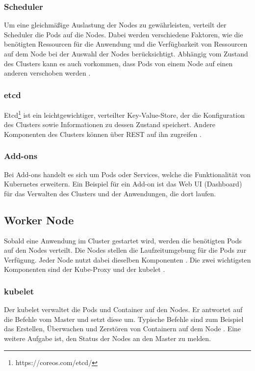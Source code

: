 \subsubsection{Scheduler}
\label{kube:scheduler}
Um eine gleichmäßige Auslastung der Nodes zu gewährleisten, verteilt der Scheduler die Pods auf die Nodes. Dabei werden verschiedene Faktoren, wie die benötigten Ressourcen für die Anwendung und die Verfügbarkeit von Ressourcen auf dem Node bei der Auswahl der Nodes berücksichtigt. Abhängig vom Zustand des Clusters kann es auch vorkommen, dass Pods von einem Node auf einen anderen verschoben werden \cite{kube:components}.

\subsubsection{etcd}
Etcd\footnote{https://coreos.com/etcd/} ist ein leichtgewichtiger, verteilter Key-Value-Store, der die Konfiguration des Clusters sowie Informationen zu dessen Zustand speichert. Andere Komponenten des Clusters können über REST auf ihn zugreifen \cite[][]{9781788994729}. 

\subsubsection{Add-ons}
Bei Add-ons handelt es sich um Pods oder Services, welche die Funktionalität von Kubernetes erweitern. Ein Beispiel für ein Add-on ist das Web UI (Dashboard) für das Verwalten des Clusters und der Anwendungen, die dort laufen.

\subsection{Worker Node}
\label{workernode}
Sobald eine Anwendung im Cluster gestartet wird, werden die benötigten Pods auf den Nodes verteilt. Die Nodes stellen die Laufzeitumgebung für die Pods zur Verfügung. Jeder Node nutzt dabei dieselben Komponenten \cite{kube:components}. Die zwei wichtigsten Komponenten sind der Kube-Proxy und der kubelet \cite[][]{9781788994729}. 

\subsubsection{kubelet}
Der kubelet verwaltet die Pods und Container auf den Nodes. Er antwortet auf die Befehle vom Master und setzt diese um. Typische Befehle sind zum Beispiel das Erstellen, Überwachen und Zerstören von Containern auf dem Node \cite{Rensin2015Kubernetes43826}.
Eine weitere Aufgabe ist, den Status der Nodes an den Master zu melden.

